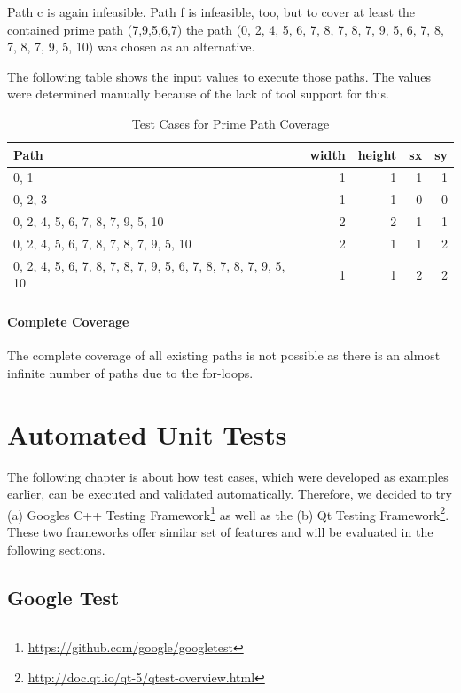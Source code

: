 \documentclass{scrreprt}
\begin{document}
Path c is again infeasible. Path f is infeasible, too, but to cover at least the contained prime path (7,9,5,6,7) the path (0, 2, 4, 5, 6, 7, 8, 7, 8, 7, 9, 5, 6, 7, 8, 7, 8, 7, 9, 5, 10) was chosen as an alternative.

The following table shows the input values to execute those paths. The values were determined manually because of the lack of tool support for this.

\begin{table}[h]
	\centering
	\caption{Test Cases for Prime Path Coverage}
	\begin{tabular}{l|r|r|r|r}
		Path           & width & height & sx & sy  \\ \hline
		0, 1           &     1 &      1 &  1 &  1  \\
		0, 2, 3        &     1 &      1 &  0 &  0  \\
		0, 2, 4, 5, 6, 7, 8, 7, 9, 5, 10        &     2 &      2 &  1 &  1  \\
		0, 2, 4, 5, 6, 7, 8, 7, 8, 7, 9, 5, 10  &     2 &      1 &  1 &  2  \\
		0, 2, 4, 5, 6, 7, 8, 7, 8, 7, 9, 5, 6, 7, 8, 7, 8, 7, 9, 5, 10 &     1 &      1 &  2 &  2  \\
	\end{tabular}
\end{table}

\paragraph{Complete Coverage} The complete coverage of all existing paths is not possible as there is an almost infinite number of paths due to the for-loops.


\section{Automated Unit Tests}

The following chapter is about how test cases, which were developed as examples earlier, can be executed and validated automatically. Therefore, we decided to try (a) Googles C++ Testing Framework\footnote{\url{https://github.com/google/googletest}} as well as the (b) Qt Testing Framework\footnote{\url{http://doc.qt.io/qt-5/qtest-overview.html}}. These two frameworks offer similar set of features and will be evaluated in the following sections.

\subsection{Google Test}
\end{document}
